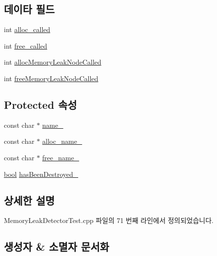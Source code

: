 \subsection*{데이타 필드}
\begin{DoxyCompactItemize}
\item 
int \hyperlink{class_allocator_for_memory_leak_detection_test_a2804c2bae21eb67c6534a07ff8bcb052}{alloc\+\_\+called}
\item 
int \hyperlink{class_allocator_for_memory_leak_detection_test_a52417195228fdceb143ea43d63e0b35c}{free\+\_\+called}
\item 
int \hyperlink{class_allocator_for_memory_leak_detection_test_aaf6f229fa8c54410237c483de6809563}{alloc\+Memory\+Leak\+Node\+Called}
\item 
int \hyperlink{class_allocator_for_memory_leak_detection_test_a26bd6f5a3dada2c70d5baf0efb03a551}{free\+Memory\+Leak\+Node\+Called}
\end{DoxyCompactItemize}
\subsection*{Protected 속성}
\begin{DoxyCompactItemize}
\item 
const char $\ast$ \hyperlink{class_test_memory_allocator_a7dac8366c11fbcad2f49d85fe8fc4fbe}{name\+\_\+}
\item 
const char $\ast$ \hyperlink{class_test_memory_allocator_ae5a98ff3b709da10db95a0ed03362548}{alloc\+\_\+name\+\_\+}
\item 
const char $\ast$ \hyperlink{class_test_memory_allocator_a4f7ece205625129df190e624cccf9286}{free\+\_\+name\+\_\+}
\item 
\hyperlink{avb__gptp_8h_af6a258d8f3ee5206d682d799316314b1}{bool} \hyperlink{class_test_memory_allocator_a971604f223534e64d5024d63396b397a}{has\+Been\+Destroyed\+\_\+}
\end{DoxyCompactItemize}


\subsection{상세한 설명}


Memory\+Leak\+Detector\+Test.\+cpp 파일의 71 번째 라인에서 정의되었습니다.



\subsection{생성자 \& 소멸자 문서화}
